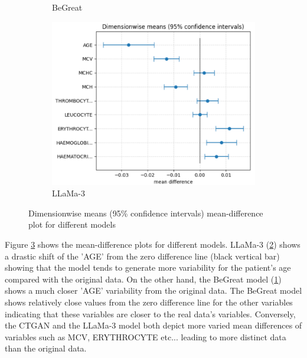 \begin{figure}[H]
\begin{subfigure}[b]{0.47\textwidth}
        \caption{BeGreat}
        \label{fig:avg_dim_2_begreat}
    \end{subfigure}
    \hfill
    \begin{subfigure}[b]{0.48\textwidth}
        \centering
        \includegraphics[width=\textwidth]{images/avg_dim_2_llama.png}
        \caption{LLaMa-3}
        \label{fig:avg_dim_2_llama}
    \end{subfigure}
    \caption{Dimensionwise means (95\% confidence intervals) mean-difference plot for different models}
    \label{fig:dim_means_distrib_2}
\end{figure}


Figure \ref{fig:dim_means_distrib_2} shows the mean-difference plots for different models. LLaMa-3 (\ref{fig:avg_dim_2_llama}) shows a drastic shift of the 'AGE' from the zero difference line (black vertical bar) showing that the model tends to generate more variability for the patient's age compared with the original data. On the other hand, the BeGreat model (\ref{fig:avg_dim_2_begreat}) shows a much closer 'AGE' variability from the original data. 
The BeGreat model shows relatively close values from the zero difference line for the other variables indicating that these variables are closer to the real data's variables. Conversely, the CTGAN and the LLaMa-3 model both depict more varied mean differences of variables such as MCV, ERYTHROCYTE etc... leading to more distinct data than the original data. 




